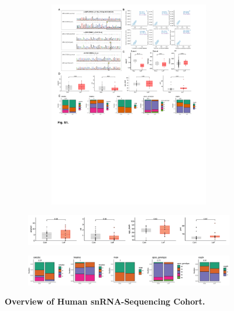 \begin{figure}[H]
\begin{subfigure}[t]{.5\textwidth}
\begin{subfigure}[t]{\textwidth}
            \caption{}
            \includegraphics[width=\textwidth]{./extended_plots/protein_levels_extended.pdf}        
        \end{subfigure}  
    \end{subfigure}  
    \begin{subfigure}[t]{\textwidth}
        \caption{}
        \includegraphics[width=\textwidth]{./extended_plots/batch_cont_var.png}        
    \end{subfigure}  
    \begin{subfigure}[t]{\textwidth}
        \caption{}
        \includegraphics[width=\textwidth]{./extended_plots/batch_categorical_vars.png}        
    \end{subfigure}  
    \caption{
        \textbf{Overview of Human snRNA-Sequencing Cohort.}\\
    }
    \label{fig:snRNA_cohort}
\end{figure}
